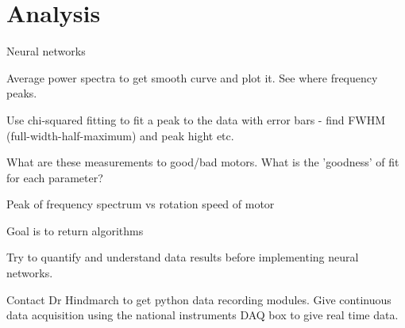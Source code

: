 \documentclass[11pt]{meetingmins}
\begin{document}
\section{Analysis}
\begin{items}
\item
Neural networks

\item
Average power spectra to get smooth curve and plot it. See where frequency peaks.

\item
Use chi-squared fitting to fit a peak to the data with error bars - find FWHM (full-width-half-maximum) and peak hight etc.

\item
What are these measurements to good/bad motors. What is the 'goodness' of fit for each parameter?

\item
Peak of frequency spectrum vs rotation speed of motor

\item
Goal is to return algorithms

\item
Try to quantify and understand data results before implementing neural networks.

\item
Contact Dr Hindmarch to get python data recording modules. Give continuous data acquisition using the national instruments DAQ box to give real time data.

\end{items}
\end{document}
